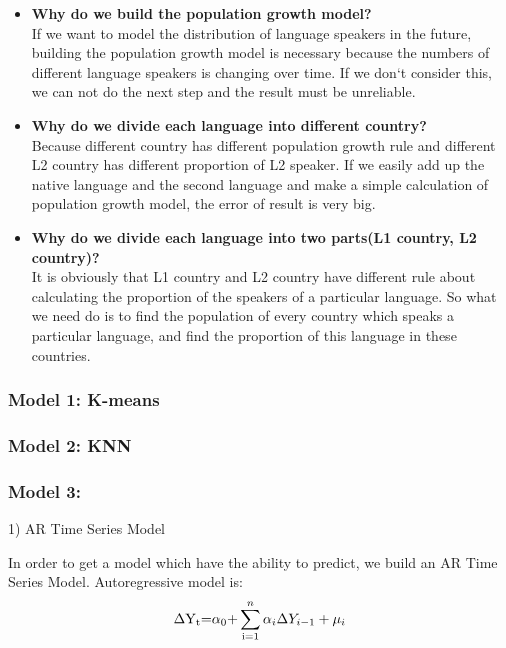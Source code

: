             \begin{itemize}     %
                \item \textbf{Why do we build the population growth model?}\\         %
        If we want to model the distribution of language speakers in the future, building the population growth model is necessary because the numbers of different language speakers is changing over time. If we don`t consider this, we can not do the next step and the result must be unreliable.
                \item \textbf{Why do we divide each language into different country?}\\  %
        Because different country has different population growth rule and different L2 country has different proportion of L2 speaker. If we easily add up the native language and the second language and make a simple calculation of population growth model, the error of result is very big.
                \item \textbf{Why do we divide each language into two parts(L1 country, L2 country)?}\\
        It is obviously that L1 country and L2 country have different rule about calculating the proportion of the speakers of a particular language. So what we need do is to find the population of every country which speaks a particular language, and find the proportion of this language in these countries.
            \end{itemize}

    \subsubsection{Model 1: K-means}
    \subsubsection{Model 2: KNN}
    \subsubsection{Model 3: }
    1) AR Time Series Model

In order to get a model which have the ability to predict, we build an AR Time Series Model. Autoregressive model is:
\[\Delta {{\rm{Y}}_{\rm{t}}}{\rm{ = }}{\alpha _{\rm{0}}}{\rm{ + }}\sum\limits_{{\rm{i = 1}}}^n {{\alpha _i}\Delta {Y_{i - 1}} + {\mu _i}} \]


